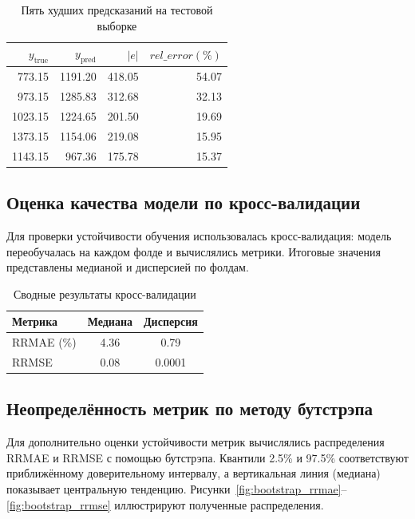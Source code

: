 \begin{table}[h!]
\centering
\begin{tabular}{|r|r|r|r|}
\hline
$y_{\mathrm{true}}$ & $y_{\mathrm{pred}}$ & $|e|$ & $rel\_error(\%)$ \\
\hline
773.15 & 1191.20 & 418.05 & 54.07 \\ \hline
973.15 & 1285.83 & 312.68 & 32.13 \\ \hline
1023.15 & 1224.65 & 201.50 & 19.69 \\ \hline
1373.15 & 1154.06 & 219.08 & 15.95 \\ \hline
1143.15 & 967.36 & 175.78 & 15.37 \\ \hline
\end{tabular}
\captionsetup{justification=centering}
\caption{Пять худших предсказаний на тестовой выборке}
\label{tab:worst_predictions_test}
\end{table}

\subsection{Оценка качества модели по кросс-валидации}
Для проверки устойчивости обучения использовалась кросс-валидация: 
модель переобучалась на каждом фолде и вычислялись метрики.
Итоговые значения представлены медианой и дисперсией по фолдам.

\begin{table}[h!]
\centering
\begin{tabular}{|l|c|c|}
\hline
Метрика & Медиана & Дисперсия \\
\hline
RRMAE (\%) & 4.36 & 0.79 \\
RRMSE & 0.08 & 0.0001 \\
\hline
\end{tabular}
\captionsetup{justification=centering}
\caption{Сводные результаты кросс-валидации}
\label{tab:cv_summary}
\end{table}

\subsection{Неопределённость метрик по методу бутстрэпа}
Для дополнительно оценки устойчивости метрик вычислялись распределения 
RRMAE и RRMSE с помощью бутстрэпа.
Квантили 2.5\% и 97.5\% соответствуют приближённому доверительному 
интервалу, а вертикальная линия (медиана) показывает центральную 
тенденцию.
Рисунки~\ref{fig:bootstrap_rrmae}--\ref{fig:bootstrap_rrmse} иллюстрируют 
полученные распределения.

